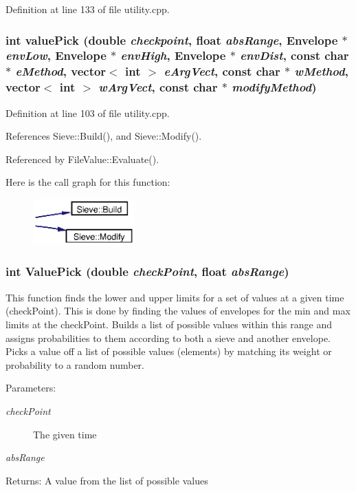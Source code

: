 Definition at line 133 of file utility.cpp.
\subsubsection{\setlength{\rightskip}{0pt plus 5cm}int value\-Pick (double {\em checkpoint}, float {\em abs\-Range}, Envelope $\ast$ {\em env\-Low}, Envelope $\ast$ {\em env\-High}, Envelope $\ast$ {\em env\-Dist}, const char $\ast$ {\em e\-Method}, vector$<$ int $>$ {\em e\-Arg\-Vect}, const char $\ast$ {\em w\-Method}, vector$<$ int $>$ {\em w\-Arg\-Vect}, const char $\ast$ {\em modify\-Method})}\label{utility_8cpp_a3}




Definition at line 103 of file utility.cpp.

References Sieve::Build(), and Sieve::Modify().

Referenced by File\-Value::Evaluate().

Here is the call graph for this function:\begin{figure}[H]
\begin{center}
\leavevmode
\includegraphics[width=111pt]{utility_8cpp_a3_cgraph}
\end{center}
\end{figure}
\subsubsection{\setlength{\rightskip}{0pt plus 5cm}int Value\-Pick (double {\em check\-Point}, float {\em abs\-Range})}\label{utility_8cpp_a2}


This function finds the lower and upper limits for a set of values at a given time (check\-Point). This is done by finding the values of envelopes for the min and max limits at the check\-Point. Builds a list of possible values within this range and assigns probabilities to them according to both a sieve and another envelope. Picks a value off a list of possible values (elements) by matching its weight or probability to a random number. \begin{Desc}
\item[Parameters:]
\begin{description}
\item[{\em check\-Point}]The given time \item[{\em abs\-Range}]\end{description}
\end{Desc}
\begin{Desc}
\item[Returns:]A value from the list of possible values \end{Desc}


